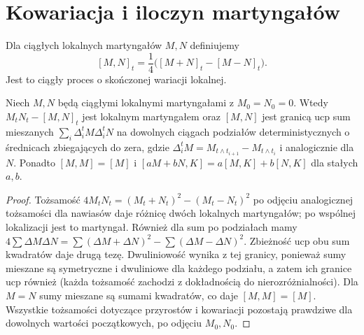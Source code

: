 \section{Kowariacja i iloczyn martyngałów}
\begin{definicja}[Kowariacja]
Dla ciągłych lokalnych martyngałów $M,N$ definiujemy
\[
[M,N]_t=\frac14\bigl([M+N]_t-[M-N]_t\bigr).
\]
Jest to ciągły proces o skończonej wariacji lokalnej.
\end{definicja}

\begin{twierdzenie}
\label{thm:cross-bracket}
Niech $M,N$ będą ciągłymi lokalnymi martyngałami
z $M_0=N_0=0$. Wtedy
$M_tN_t-[M,N]_t$ jest lokalnym martyngałem oraz
$[M,N]$ jest granicą ucp sum mieszanych
$\sum_i\Delta_i^tM\Delta_i^tN$ na dowolnych
ciągach podziałów deterministycznych o średnicach
zbiegających do zera, gdzie
$\Delta_i^tM=M_{t\wedge t_{i+1}}-M_{t\wedge t_i}$
i analogicznie dla $N$.
Ponadto $[M,M]=[M]$ i
$[aM+bN,K]=a[M,K]+b[N,K]$ dla stałych $a,b$.
\end{twierdzenie}
\begin{proof}
Tożsamość
$4M_tN_t=(M_t+N_t)^2-(M_t-N_t)^2$
po odjęciu analogicznej tożsamości dla nawiasów
daje różnicę dwóch lokalnych martyngałów;
po wspólnej lokalizacji jest to martyngał.
Również dla sum po podziałach mamy
$4\sum\Delta M\Delta N=
\sum(\Delta M+\Delta N)^2-
\sum(\Delta M-\Delta N)^2$.
Zbieżność ucp obu sum kwadratów daje drugą tezę.
Dwuliniowość wynika z tej granicy, ponieważ
sumy mieszane są symetryczne i dwuliniowe dla każdego podziału,
a zatem ich granice ucp również (każda tożsamość zachodzi
z dokładnością do nierozróżnialności).
Dla $M=N$ sumy mieszane są sumami kwadratów,
co daje $[M,M]=[M]$. Wszystkie tożsamości dotyczące
przyrostów i kowariacji pozostają prawdziwe dla
dowolnych wartości początkowych, po odjęciu $M_0,N_0$.
\end{proof}

